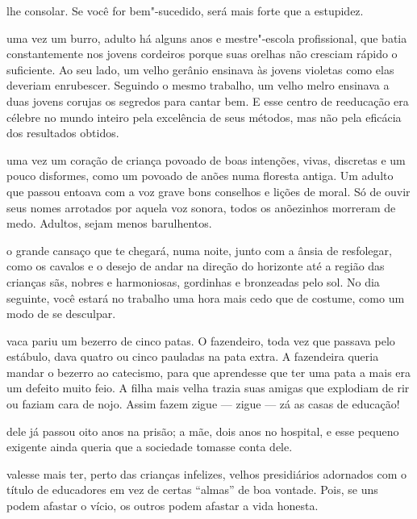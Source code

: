 \pagebreak
\thispagestyle{empty}

\movetooddpage


 lhe consolar. Se você for bem"-sucedido, será mais forte que a
estupidez.



 uma vez um burro, adulto há alguns anos e mestre"-escola
profissional, que batia constantemente nos jovens cordeiros porque suas
orelhas não cresciam rápido o suficiente. Ao seu lado, um velho gerânio
ensinava às jovens violetas como elas deveriam enrubescer. Seguindo o
mesmo trabalho, um velho melro ensinava a duas jovens corujas os
segredos para cantar bem. E esse centro de reeducação era célebre no
mundo inteiro pela excelência de seus métodos, mas não pela eficácia dos
resultados obtidos.



 uma vez um coração de criança povoado de boas intenções, vivas,
discretas e um pouco disformes, como um povoado de anões numa floresta
antiga. Um adulto que passou entoava com a voz grave bons conselhos e
lições de moral. Só de ouvir seus nomes arrotados por aquela voz
sonora, todos os anõezinhos morreram de medo. Adultos, sejam menos
barulhentos.


\pagebreak

 o grande cansaço que te chegará, numa noite, junto com a ânsia de
resfolegar, como os cavalos e o desejo de andar na direção do
horizonte até a região das crianças sãs, nobres e harmoniosas, gordinhas
e bronzeadas pelo sol. No dia seguinte, você estará no trabalho uma hora
mais cedo que de costume, como um modo de se desculpar.



 vaca pariu um bezerro de cinco patas. O fazendeiro, toda vez que
passava pelo estábulo, dava quatro ou cinco pauladas na pata extra. A
fazendeira queria mandar o bezerro ao catecismo, para que aprendesse que
ter uma pata a mais era um defeito muito feio. A filha mais velha trazia
suas amigas que explodiam de rir ou faziam cara de nojo. Assim fazem
zigue --- zigue --- zá as casas de educação!



 dele já passou oito anos na prisão; a mãe, dois anos no hospital,
e esse pequeno exigente ainda queria que a sociedade tomasse conta dele.

\pagebreak

 valesse mais ter, perto das crianças infelizes, velhos
presidiários adornados com o título de educadores em vez de certas
``almas'' de boa vontade. Pois, se uns podem afastar o vício, os outros
podem afastar a vida honesta.



